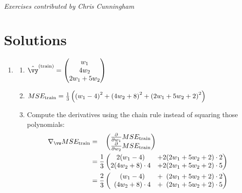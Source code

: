 \documentclass{article}
\newcommand{\utrain}{^{\textnormal{(train)}}}
\newcommand{\strain}{_{\textnormal{train}}}
\begin{document}
\begin{enumerate}
{\em Exercises contributed by Chris Cunningham}
\end{enumerate}

\section*{Solutions}

\begin{enumerate}

\item \label{ML_ex_regression_solution}
\begin{enumerate}
    \item $\hat{\vy}\utrain = \begin{pmatrix} w_1\\ 4w_2 \\ 2w_1 + 5w_2 \end{pmatrix}$
    \item $MSE\strain = \frac13\left(\left(w_1-4\right)^2 + \left(4w_2+8\right)^2+\left(2w_1+5w_2+2\right)^2\right)$ 
    \item Compute the derivatives using the chain rule instead of squaring those polynomials:
    \begin{align*} \nabla_\vw MSE\strain & = \phantom{\frac13} \begin{pmatrix}
                                            \frac{\partial}{\partial w_1}MSE\strain   \\ 
                                            \frac{\partial}{\partial w_2}MSE\strain
                                            \end{pmatrix} \\
                              & = \frac13 \begin{pmatrix}
                                            2(w_1-4)        & + 2(2w_1+5w_2+2)\cdot 2 \\ 
                                            2(4w_2+8)\cdot4 & + 2(2w_1+5w_2+2)\cdot 5
                                            \end{pmatrix} \\
                              & = \frac23 \begin{pmatrix}
                                            \phantom2(w_1-4)         & + \phantom2(2w_1+5w_2+2)\cdot 2  \\ 
                                            \phantom2(4w_2+8)\cdot4  & + \phantom2(2w_1+5w_2+2)\cdot 5

\end{pmatrix}
\end{align*}
\end{enumerate}
\end{enumerate}
\end{document}
